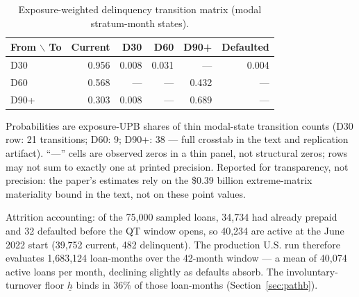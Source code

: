 \documentclass[12pt]{article}
\begin{document}
\begin{table}[t]
\centering
\small
\begin{threeparttable}
\caption{Exposure-weighted delinquency transition matrix (modal stratum-month states).}
\label{tab:delinq}
\begin{tabular}{@{}lrrrrr@{}}
\toprule
From $\backslash$ To & Current & D30 & D60 & D90+ & Defaulted \\
\midrule
D30 & 0.956 & 0.008 & 0.031 & --- & 0.004 \\
D60 & 0.568 & --- & --- & 0.432 & --- \\
D90+ & 0.303 & 0.008 & --- & 0.689 & --- \\
\bottomrule
\end{tabular}
\begin{tablenotes}[flushleft]\footnotesize
\item Probabilities are exposure-UPB shares of thin modal-state transition counts (D30 row: 21 transitions; D60: 9; D90+: 38 --- full crosstab in the text and replication artifact). ``---'' cells are observed zeros in a thin panel, not structural zeros; rows may not sum to exactly one at printed precision. Reported for transparency, not precision: the paper's estimates rely on the \$0.39 billion extreme-matrix materiality bound in the text, not on these point values.
\end{tablenotes}
\end{threeparttable}
\end{table}

Attrition accounting: of the 75,000 sampled loans, 34,734 had already prepaid and 32 defaulted before the QT window opens, so 40,234 are active at the June 2022 start (39,752 current, 482 delinquent). The production U.S. run therefore evaluates 1,683,124 loan-months over the 42-month window --- a mean of 40,074 active loans per month, declining slightly as defaults absorb. The involuntary-turnover floor $\underline{h}$ binds in 36\% of those loan-months (Section~\ref{sec:pathb}).

\nocite{cfpb_atr,frbny_soma,fred_actliscou,fred_wshomcb,fred_dspic96,fred_umcsent}



\end{document}
